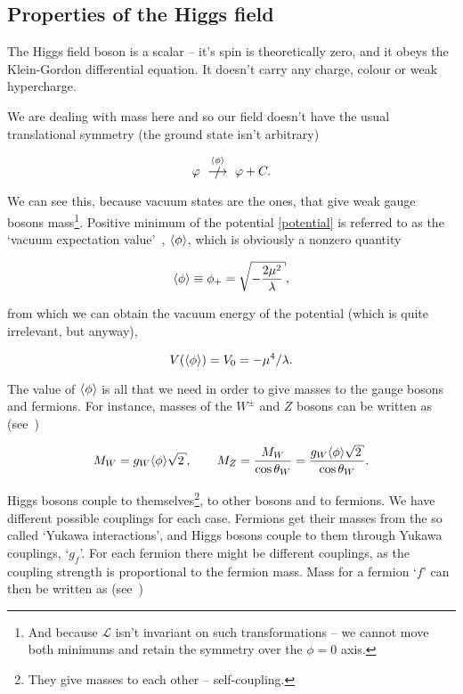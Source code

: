 \subsection{Properties of the Higgs field}

The Higgs field boson is a scalar -- it's spin is theoretically zero, and it obeys the Klein-Gordon differential equation. It
doesn't carry any charge, colour or weak hypercharge.

We are dealing with mass here and so our field doesn't have the usual translational symmetry (the ground state isn't arbitrary)

\[
	\varphi\ \stackrel{\vac}{\slashed{\longrightarrow}}\ \varphi + C.
\]

We can see this, because vacuum states are the ones, that give weak gauge bosons mass\footnote{And because $\mathcal{L}$
isn't invariant on such transformations -- we cannot move both minimums and retain the symmetry over the $\phi = 0$ axis.}.
Positive minimum of the potential  \eqref{potential} is referred to as the `vacuum expectation value'~\cite{elena:green},
$\langle\phi\rangle$, which is obviously a nonzero quantity

\begin{equation}
	\vac \equiv \phi_+ = \sqrt{-\frac{2\mu^2}{\lambda}}, \label{vacuum:field}
\end{equation}

from which we can obtain the vacuum energy of the potential (which is quite irrelevant, but anyway),

\begin{equation}
	V(\langle\phi\rangle) = V_0 = -\mu^4/\lambda. \label{vacuum:energy}
\end{equation}

The value of $\langle\phi\rangle$ is all that we need in order to give masses to the gauge bosons and fermions. For instance,
masses of the $W^\pm$ and $Z$ bosons can be written as \hbox{(see~\cite[pg. 19]{elena:green})}

\begin{equation}
	M_W = g_W \vac\sqrt{2}, \qquad M_Z = \frac{M_W}{\cos\theta_W} = \frac{g_W \vac\sqrt{2}}
		{\cos\theta_W}. \label{mass:weak}
\end{equation}

Higgs bosons couple to themselves\footnote{They give masses to each other -- self-coupling.}, to other bosons and to fermions. We
have different possible couplings for each case. Fermions get their masses from the so called `Yukawa interactions', and Higgs bosons
couple to them through Yukawa couplings, `$g_f$'. For each fermion there might be different couplings, as the coupling
strength is proportional to the fermion mass. Mass for a fermion `$f$' can then be written as \hbox{(see~\cite[pg. 19]{elena:green})}

